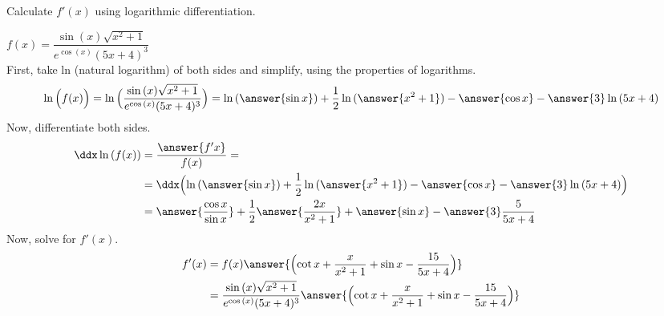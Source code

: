 \documentclass{ximera}
\author{Nela Lakos}
\begin{document}
\begin{exercise}

Calculate $f'(x)$ using logarithmic differentiation. 

 $f(x)=\dfrac{\sin{(x)}\sqrt{x^2+1}}{e^{\cos{(x)}}(5x+4)^3}$\\

First, take ln (natural logarithm) of both sides and simplify, using the properties of logarithms.
\begin{align*}
\ln{\Bigl(f(x)\Bigr)}=\ln{\Bigl(\dfrac{\sin{(x)}\sqrt{x^2+1}}{e^{\cos{(x)}}(5x+4)^3}\Bigr)} &=\ln{(\answer{\sin{x}})}+\dfrac{1}{2}\ln{(\answer{x^2+1})}-\answer{\cos{x}}-\answer{3}\ln{(5x+4)} \\
\end{align*}
Now, differentiate both sides.
\begin{align*}
\ddx \ln{(f(x))} &= \dfrac{\answer{f'{x}}}{f(x)}=\\
&=\ddx\Bigl(\ln{(\answer{\sin{x}})}+\dfrac{1}{2}\ln{(\answer{x^2+1})}-\answer{\cos{x}}-\answer{3}\ln{(5x+4)} \Bigr)\\
 &=\answer{\dfrac{\cos{x}}{\sin{x}}}+\dfrac{1}{2}\answer{\dfrac{2x}{x^2+1}}+\answer{\sin{x}}-\answer{3}\dfrac{5}{5x+4}
\end{align*}
Now, solve for $f'(x)$.
\begin{align*}
f'(x)&=f(x)\answer{\Bigl(\cot{x}+\dfrac{x}{x^2+1}+\sin{x}-\dfrac{15}{5x+4}\Bigr)}\\
&=\dfrac{\sin{(x)}\sqrt{x^2+1}}{e^{\cos{(x)}}(5x+4)^3}\answer{\Bigl(\cot{x}+\dfrac{x}{x^2+1}+\sin{x}-\dfrac{15}{5x+4}\Bigr)}
\end{align*}
\end{exercise}
\end{document}

